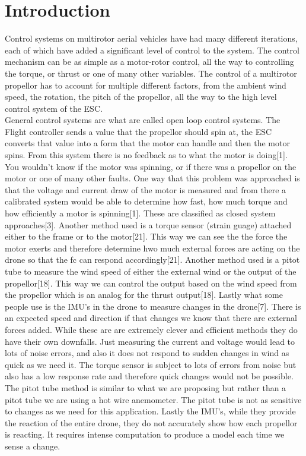 \documentclass{article}
\begin{document}
\section{Introduction}


Control systems on multirotor aerial vehicles have had many different iterations, each of which have added a significant level of control to the system. The control mechanism can be as simple as a motor-rotor control, all the way to controlling the torque, or thrust or one of many other variables. The control of a multirotor propellor has to account for multiple different factors, from the ambient wind speed, the rotation, the pitch of the propellor, all the way to the high level control system of the ESC. \\

General control systems are what are called open loop control systems. The Flight controller sends a value that the propellor should spin at, the ESC converts that value into a form that the motor can handle and then the motor spins. From this system there is no feedback as to what the motor is doing[1]. You wouldn't know if the motor was spinning, or if there was a propellor on the motor or one of many other faults. One way that this problem was approached is that the voltage and current draw of the motor is measured and from there a calibrated system would be able to determine how fast, how much torque and how efficiently a motor is spinning[1]. These are classified as closed system approaches[3]. Another method used is a torque sensor (strain guage) attached either to the frame or to the motor[21]. This way we can see the the force the motor exerts and therefore determine hwo much external forces are acting on the drone so that the fc can respond accordingly[21]. Another method used is a pitot tube to measure the wind speed of either the external wind or the output of the propellor[18]. This way we can control the output based on the wind speed from the propellor which is an analog for the thrust output[18]. Lastly what some people use is the IMU's in the drone to measure changes in the drone[7]. There is an expected speed and direction if that changes we know that there are external forces added. While these are are extremely clever and efficient methods they do have their own downfalls. Just measuring the current and voltage would lead to lots of noise errors, and also it does not respond to sudden changes in wind as quick as we need it. The torque sensor is subject to lots of errors from noise but also has a low response rate and therefore quick changes would not be possible. The pitot tube method is similar to what we are proposing but rather than a pitot tube we are using a hot wire anemometer. The pitot tube is not as sensitive to changes as we need for this application. Lastly the IMU's, while they provide the reaction of the entire drone, they do not accurately show how each propellor is reacting. It requires intense computation to produce a model each time we sense a change. 
\end{document}
